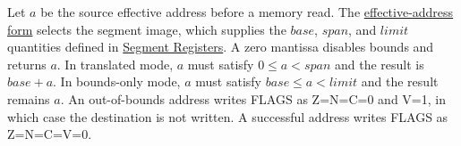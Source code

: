 Let \(a\) be the source effective address before a memory read. The
\hyperref[page:effective-addressing-modes]{effective-address form} selects the segment image, which supplies the
\(\mathit{base}\), \(\mathit{span}\), and \(\mathit{limit}\) quantities defined in
\hyperref[section:segment-registers]{Segment Registers}.
A zero mantissa disables bounds and returns \(a\). In translated mode, \(a\) must satisfy
\(0 \le a < \mathit{span}\) and the result is \(\mathit{base}+a\). In bounds-only mode, \(a\) must satisfy
\(\mathit{base} \le a < \mathit{limit}\) and the result remains \(a\). An out-of-bounds address writes FLAGS as
Z=N=C=0 and V=1, in which case the destination is not written. A successful address writes FLAGS as Z=N=C=V=0.
